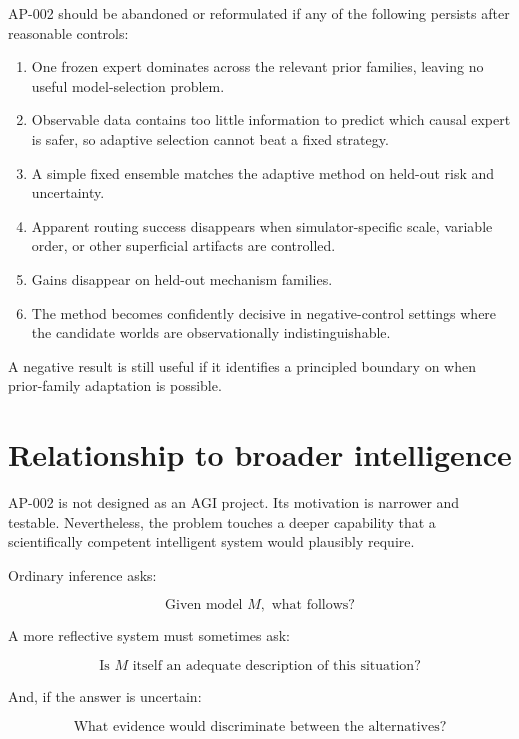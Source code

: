 \documentclass[11pt]{article}
\begin{document}
AP-002 should be abandoned or reformulated if any of the following persists after reasonable controls:

\begin{enumerate}
  \item One frozen expert dominates across the relevant prior families, leaving no useful model-selection problem.
  \item Observable data contains too little information to predict which causal expert is safer, so adaptive selection cannot beat a fixed strategy.
  \item A simple fixed ensemble matches the adaptive method on held-out risk and uncertainty.
  \item Apparent routing success disappears when simulator-specific scale, variable order, or other superficial artifacts are controlled.
  \item Gains disappear on held-out mechanism families.
  \item The method becomes confidently decisive in negative-control settings where the candidate worlds are observationally indistinguishable.
\end{enumerate}

A negative result is still useful if it identifies a principled boundary on when prior-family adaptation is possible.

\section{Relationship to broader intelligence}

AP-002 is not designed as an AGI project. Its motivation is narrower and testable. Nevertheless, the problem touches a deeper capability that a scientifically competent intelligent system would plausibly require.

Ordinary inference asks:

\begin{equation}
\text{Given model }M,\text{ what follows?}
\end{equation}

A more reflective system must sometimes ask:

\begin{equation}
\text{Is }M\text{ itself an adequate description of this situation?}
\end{equation}

And, if the answer is uncertain:

\begin{equation}
\text{What evidence would discriminate between the alternatives?}
\end{equation}
\end{document}
